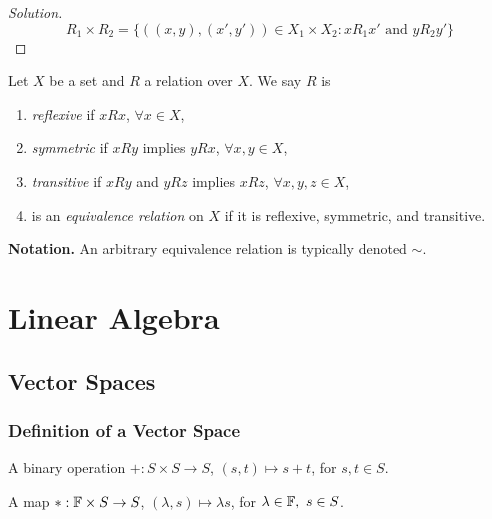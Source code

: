 \documentclass[12pt]{book}
\begin{document}
\begin{proof}[Solution]
    \[
        R_1 \times R_2 = \{ ((x,y),(x',y')) \in X_1 \times X_2 : xR_1x' \text{ and } yR_2y' \}
    \]
\end{proof}


\begin{definition}
     Let $X$ be a set and $R$ a relation over $X.$ We say $R$ is
     \begin{enumerate}
         \item \emph{reflexive} if $xRx$,  $\forall x \in X$,
         \item \emph{symmetric} if $xRy$ implies $yRx$,  $\forall x,y \in X$,
         \item \emph{transitive} if $xRy$ and $yRz$ implies $xRz$, $\forall x,y,z \in X$,
         \item is an \emph{equivalence relation} on $X$ if it is reflexive, symmetric, and transitive.
     \end{enumerate}
\end{definition}

\textbf{Notation.} An arbitrary equivalence relation is typically denoted $\sim$.



\chapter{Linear Algebra} 

\section{Vector Spaces}

\subsection{Definition of a Vector Space}

\begin{definition}[Addition]\label{def:addition}
    A binary operation $+: S \times S \to S$, $(s,t) \mapsto s+t$, for $s,t \in S$.
\end{definition}

\begin{definition}\label{def:scalar-mult}
    A map $*: \mathbb{F} \times S \to S$, $(\lambda, s) \mapsto \lambda s$, for $\lambda \in \mathbb{F},\ s \in S$.
\end{definition}
\end{document}
